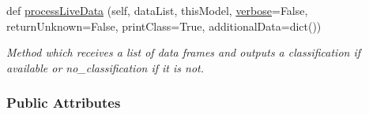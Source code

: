 \begin{DoxyCompactItemize}
def \hyperlink{group__icubclient__SAM__Drivers_ab7e00f1a17cf5022d7a0864ed2e097aa}{process\+Live\+Data} (self, data\+List, this\+Model, \hyperlink{group__icubclient__SAM__Drivers_ga48cfefc6532ba606936b9fd7f3156da8}{verbose}=False, return\+Unknown=False, print\+Class=True, additional\+Data=dict())
\begin{DoxyCompactList}\small\item\em Method which receives a list of data frames and outputs a classification if available or \textquotesingle{}no\+\_\+classification\textquotesingle{} if it is not. \end{DoxyCompactList}\end{DoxyCompactItemize}
\subsubsection*{Public Attributes}
